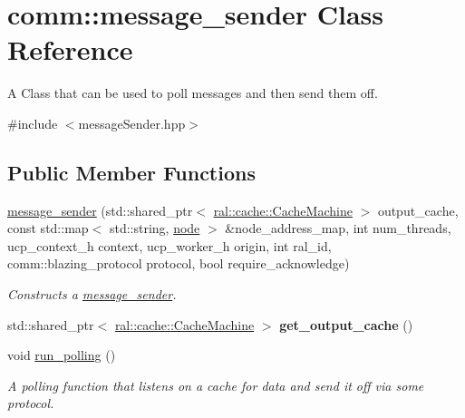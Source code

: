 \hypertarget{classcomm_1_1message__sender}{}\section{comm\+:\+:message\+\_\+sender Class Reference}
\label{classcomm_1_1message__sender}


A Class that can be used to poll messages and then send them off.  




{\ttfamily \#include $<$message\+Sender.\+hpp$>$}

\subsection*{Public Member Functions}
\begin{DoxyCompactItemize}
\item 
\hyperlink{classcomm_1_1message__sender_a0908364a7c34e29380f7a309b1f65c14}{message\+\_\+sender} (std\+::shared\+\_\+ptr$<$ \hyperlink{classral_1_1cache_1_1CacheMachine}{ral\+::cache\+::\+Cache\+Machine} $>$ output\+\_\+cache, const std\+::map$<$ std\+::string, \hyperlink{classcomm_1_1node}{node} $>$ \&node\+\_\+address\+\_\+map, int num\+\_\+threads, ucp\+\_\+context\+\_\+h context, ucp\+\_\+worker\+\_\+h origin, int ral\+\_\+id, comm\+::blazing\+\_\+protocol protocol, bool require\+\_\+acknowledge)
\begin{DoxyCompactList}\small\item\em Constructs a \hyperlink{classcomm_1_1message__sender}{message\+\_\+sender}. \end{DoxyCompactList}\item 
\mbox{\label{classcomm_1_1message__sender_ae17b0a7069bfa71991a39c932680eb01}} 
std\+::shared\+\_\+ptr$<$ \hyperlink{classral_1_1cache_1_1CacheMachine}{ral\+::cache\+::\+Cache\+Machine} $>$ {\bfseries get\+\_\+output\+\_\+cache} ()
\item 
\mbox{\label{classcomm_1_1message__sender_af686fdcc4f5d1c078f02ff1988725c06}} 
void \hyperlink{classcomm_1_1message__sender_af686fdcc4f5d1c078f02ff1988725c06}{run\+\_\+polling} ()
\begin{DoxyCompactList}\small\item\em A polling function that listens on a cache for data and send it off via some protocol. \end{DoxyCompactList}\end{DoxyCompactItemize}
